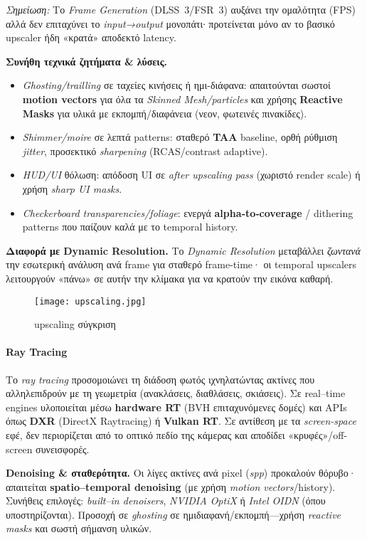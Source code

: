 \textit{Σημείωση:} Το \emph{Frame Generation} (DLSS~3/FSR~3) αυξάνει την ομαλότητα (FPS) αλλά δεν επιταχύνει το \emph{input→output} μονοπάτι∙ προτείνεται μόνο αν το βασικό upscaler ήδη «κρατά» αποδεκτό latency.

\textbf{Συνήθη τεχνικά ζητήματα \& λύσεις.}
\begin{itemize}
  \item \emph{Ghosting/trailling} σε ταχείες κινήσεις ή ημι-διάφανα: απαιτούνται σωστοί \textbf{motion vectors} για όλα τα \emph{Skinned Mesh/particles} και χρήσης \textbf{Reactive Masks} για υλικά με εκπομπή/διαφάνεια (νεον, φωτεινές πινακίδες).
  \item \emph{Shimmer/moire} σε λεπτά patterns: σταθερό \textbf{TAA} baseline, ορθή ρύθμιση \emph{jitter}, προσεκτικό \emph{sharpening} (RCAS/contrast adaptive).
  \item \emph{HUD/UI} θόλωση: απόδοση UI σε \emph{after upscaling pass} (χωριστό render scale) ή χρήση \emph{sharp UI masks}.
  \item \emph{Checkerboard transparencies/foliage}: ενεργά \textbf{alpha‐to‐coverage} / dithering patterns που παίζουν καλά με το temporal history.
\end{itemize}

\textbf{Διαφορά με Dynamic Resolution.}
Το \emph{Dynamic Resolution} μεταβάλλει \emph{ζωντανά} την εσωτερική ανάλυση ανά frame για σταθερό frame-time· οι temporal upscalers λειτουργούν «πάνω» σε αυτήν την κλίμακα για να κρατούν την εικόνα καθαρή.

\begin{figure}[H]
    \centering
    \texttt{[image: upscaling.jpg]}
    \caption{upscaling σύγκριση}
    \label{fig:placeholder}
\end{figure}

\paragraph{Ray Tracing }

Το \textit{ray tracing} προσομοιώνει τη διάδοση φωτός ιχνηλατώντας ακτίνες που αλληλεπιδρούν με τη γεωμετρία (ανακλάσεις, διαθλάσεις, σκιάσεις). Σε real–time engines υλοποιείται μέσω \textbf{hardware RT} (BVH επιταχυνόμενες δομές) και APIs όπως \textbf{DXR} (DirectX Raytracing) ή \textbf{Vulkan RT}. Σε αντίθεση με τα \textit{screen-space} εφέ, δεν περιορίζεται από το οπτικό πεδίο της κάμερας και αποδίδει «κρυφές»/off-screen συνεισφορές.

\textbf{Denoising \& σταθερότητα.}
Οι λίγες ακτίνες ανά pixel (\emph{spp}) προκαλούν θόρυβο· απαιτείται \textbf{spatio–temporal denoising} (με χρήση \emph{motion vectors}/history). Συνήθεις επιλογές: \emph{built–in denoisers}, \emph{NVIDIA OptiX} ή \emph{Intel OIDN} (όπου υποστηρίζονται). Προσοχή σε \emph{ghosting} σε ημιδιαφανή/εκπομπή—χρήση \emph{reactive masks} και σωστή σήμανση υλικών.

